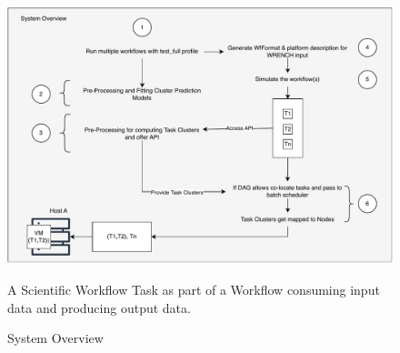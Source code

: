 \label{sec:technology_and_design_choices}
\begin{figure}[H]
    \centering
    \includegraphics[scale=0.7]{fig/05/05-system-overview.pdf}
    \small
    \caption{System Overview}
    \label{fig:05-system-overview}
    \tiny
    A Scientific Workflow Task as part of a Workflow consuming input data and producing output data.
\end{figure}
